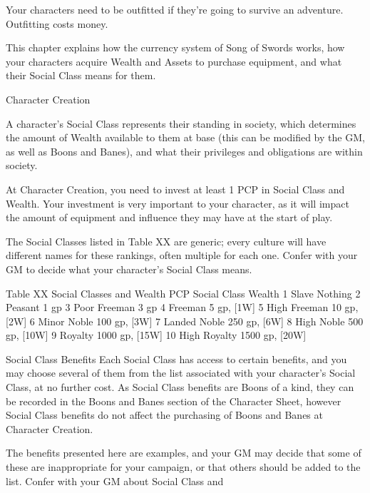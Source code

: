 \documentclass[oneside,11pt,english]{book}
\begin{document}
Your characters need to be outfitted if they’re going to survive an adventure. Outfitting costs money. 

 

This chapter explains how the currency system of Song of Swords works, how your characters acquire 
Wealth and Assets to purchase equipment, and what their Social Class means for them. 

 


Character Creation 

 

A character’s Social Class represents their standing in society, which determines the amount of Wealth 
available to them at base (this can be modified by the GM, as well as Boons and Banes), and what their 
privileges and obligations are within society. 

 

At Character Creation, you need to invest at least 1 PCP in Social Class and Wealth. Your investment is 
very important to your character, as it will impact the amount of equipment and influence they may have 
at the start of play. 

 

The Social Classes listed in Table XX are generic; every culture will have different names for these 
rankings, often multiple for each one. Confer with your GM to decide what your character’s Social Class 
means. 

 
Table XX Social Classes and Wealth 
PCP Social Class Wealth 
1 Slave Nothing 
2 Peasant 1 gp 
3 Poor Freeman 3 gp 
4 Freeman 5 gp, [1W] 
5 High Freeman 10 gp, [2W] 
6 Minor Noble 100 gp, [3W] 
7 Landed Noble 250 gp, [6W] 
8 High Noble 500 gp, [10W] 
9 Royalty 1000 gp, [15W] 
10 High Royalty 1500 gp, [20W] 

 

Social Class Benefits 
Each Social Class has access to certain benefits, and you may choose several of them from the list 
associated with your character’s Social Class, at no further cost. As Social Class benefits are Boons of a 
kind, they can be recorded in the Boons and Banes section of the Character Sheet, however Social Class 
benefits do not affect the purchasing of Boons and Banes at Character Creation. 

 

The benefits presented here are examples, and your GM may decide that some of these are inappropriate 
for your campaign, or that others should be added to the list. Confer with your GM about Social Class and 
\end{document}
